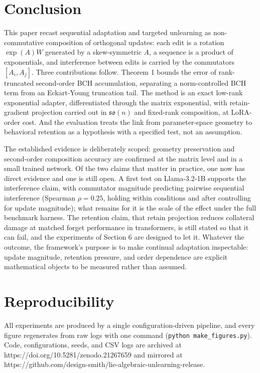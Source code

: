 \documentclass[
]{article}
\begin{document}
\section{Conclusion}\label{conclusion}

This paper recast sequential adaptation and targeted unlearning as non-commutative composition of orthogonal updates: each edit is a rotation \(\exp(A)W\) generated by a skew-symmetric \(A\), a sequence is a product of exponentials, and interference between edits is carried by the commutators \([A_i, A_j]\). Three contributions follow. Theorem 1 bounds the error of rank-truncated second-order BCH accumulation, separating a norm-controlled BCH term from an Eckart-Young truncation tail. The method is an exact low-rank exponential adapter, differentiated through the matrix exponential, with retain-gradient projection carried out in \(\mathfrak{so}(n)\) and fixed-rank composition, at LoRA-order cost. And the evaluation treats the link from parameter-space geometry to behavioral retention as a hypothesis with a specified test, not an assumption.

The established evidence is deliberately scoped: geometry preservation and second-order composition accuracy are confirmed at the matrix level and in a small trained network. Of the two claims that matter in practice, one now has direct evidence and one is still open. A first test on Llama-3.2-1B supports the interference claim, with commutator magnitude predicting pairwise sequential interference (Spearman \(\rho=0.25\), holding within conditions and after controlling for update magnitude); what remains for it is the scale of the effect under the full benchmark harness. The retention claim, that retain projection reduces collateral damage at matched forget performance in transformers, is still stated so that it can fail, and the experiments of Section 6 are designed to let it. Whatever the outcome, the framework's purpose is to make continual adaptation inspectable: update magnitude, retention pressure, and order dependence are explicit mathematical objects to be measured rather than assumed.

\section{Reproducibility}\label{reproducibility}

All experiments are produced by a single configuration-driven pipeline, and every figure regenerates from raw logs with one command (\texttt{python\ make\_figures.py}). Code, configurations, seeds, and CSV logs are archived at https://doi.org/10.5281/zenodo.21267659 and mirrored at https://github.com/design-smith/lie-algebraic-unlearning-release.
\end{document}
